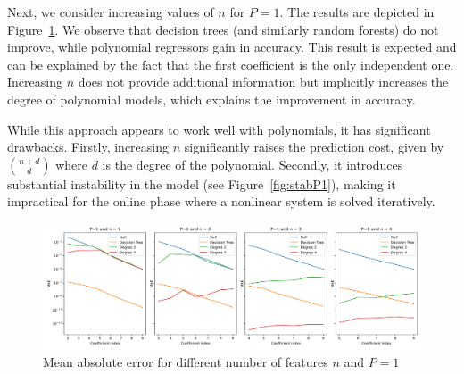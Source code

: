 \documentclass[graybox]{svmult}
\begin{document}


% 

Next, we consider increasing values of $n$ for $P=1$. The results are depicted in Figure~\ref{fig:P1n}. We observe that decision trees (and similarly random forests) do not improve, while polynomial regressors gain in accuracy. This result is expected and can be explained by the fact that the first coefficient is the only independent one. Increasing $n$ does not provide additional information but implicitly increases the degree of polynomial models, which explains the improvement in accuracy.

While this approach appears to work well with polynomials, it has significant drawbacks. Firstly, increasing $n$ significantly raises the prediction cost, given by $\binom{n+d}{d}$ where $d$ is the degree of the polynomial. Secondly, it introduces substantial instability in the model (see Figure~\ref{fig:stabP1}), making it impractical for the online phase where a nonlinear system is solved iteratively. 

\begin{figure}[!hb]
    \centering
\includegraphics[width=1.0\textwidth] {img-P1n.png}
    \caption{Mean absolute error for different number of features $n$ and $P=1$}
    \label{fig:P1n}
\end{figure}
\end{document}
